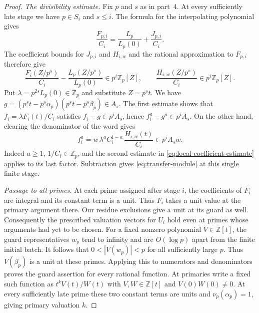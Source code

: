 \begin{proof}
    \emph{The divisibility estimate.}
    Fix $p$ and $s$ as in part~4.
    At every sufficiently late stage we have $p \in S_i$ and $s \le i$.
    The formula for the interpolating polynomial gives
    \[
        \frac{F_{p, i}}{C_i} = \frac{L_p}{L_p(0)} + \frac{J_{p, i}}{C_i}.
    \]
    The coefficient bounds for $J_{p, i}$ and $H_{i, w}$ and the rational approximation to $F_{p, i}$ therefore give
    \begin{equation}
        \label{eq:local-coefficient-estimate}
        \frac{F_i(Z/p^s)}{C_i} - \frac{L_p(Z/p^s)}{L_p(0)}
        \in p^i\mathbb{Z}_p[Z],
        \qquad
        \frac{H_{i, w}(Z/p^s)}{C_i} \in p^i\mathbb{Z}_p[Z].
    \end{equation}
    Put $\lambda = p^{2s}L_p(0) \in \mathbb{Z}_p$ and substitute $Z = p^s t$.
    We have $g = (p^s t - p^s\alpha_p)(p^s t - p^s\beta_p) \in A_s$.
    The first estimate shows that $f_i = \lambda F_i(t)/C_i$ satisfies $f_i - g \in p^i A_s$, hence $f_i^a - g^a \in p^i A_s$.
    On the other hand, clearing the denominator of the word gives
    \[
        f_i^a = w\,\lambda^a C_i^{1 - a}\,\frac{H_{i, w}(t)}{C_i}
        \in p^i A_s w .
    \]
    Indeed $a \ge 1$, $1/C_i \in \mathbb{Z}_p$, and the second estimate in \eqref{eq:local-coefficient-estimate} applies to its last factor.
    Subtraction gives \eqref{eq:transfer-module} at this single finite stage.

    \emph{Passage to all primes.}
    At each prime assigned after stage $i$, the coefficients of $F_i$ are integral and its constant term is a unit.
    Thus $F_i$ takes a unit value at the primary argument there.
    Our residue exclusions give a unit at its guard as well.
    Consequently the prescribed valuation vectors for $U_i$ hold even at primes whose arguments had yet to be chosen.
    For a fixed nonzero polynomial $V \in \mathbb{Z}[t]$, the guard representatives $w_p$ tend to infinity and are $O(\log p)$ apart from the finite initial batch.
    It follows that $0 < |V(w_p)| < p$ for all sufficiently large $p$.
    Thus $V(\beta_p)$ is a unit at these primes.
    Applying this to numerators and denominators proves the guard assertion for every rational function.
    At primaries write a fixed such function as $t^k V(t)/W(t)$ with $V, W \in \mathbb{Z}[t]$ and $V(0)W(0) \ne 0$.
    At every sufficiently late prime these two constant terms are units and $\nu_p(\alpha_p) = 1$, giving primary valuation $k$.


\end{proof}
